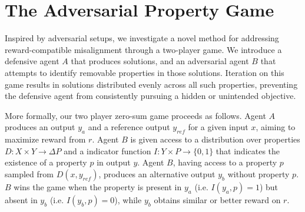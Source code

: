 \section{The Adversarial Property Game} \label{sec:adversarial_games}


Inspired by adversarial setups, we investigate a novel method for addressing reward-compatible misalignment through a two-player game. We introduce a defensive agent $A$ that produces solutions, and an adversarial agent $B$ that attempts to identify removable properties in those solutions. Iteration on this game results in solutions distributed evenly across all such properties, preventing the defensive agent from consistently pursuing a hidden or unintended objective.
 

More formally, our two player zero-sum game proceeds as follows. Agent $A$ produces an output $y_a$ and a reference output $y_{ref}$ for a given input $x$, aiming to maximize reward from $r$. 
Agent $B$ is given access to a distribution over properties $D: X \times Y \to \Delta P$ and a indicator function $I: Y \times P \to \{0,1\}$ that indicates the existence of a property $p$ in output $y$.
Agent $B$, having access to a property $p$ sampled from $D(x,y_{ref})$, produces an alternative output $y_b$ without property $p$. $B$ wins the game when the property is present in $y_a$ (i.e. $I(y_a,p)=1$) but absent in $y_b$ (i.e. $I(y_b,p)=0$), while $y_b$ obtains similar or better reward on $r$.




